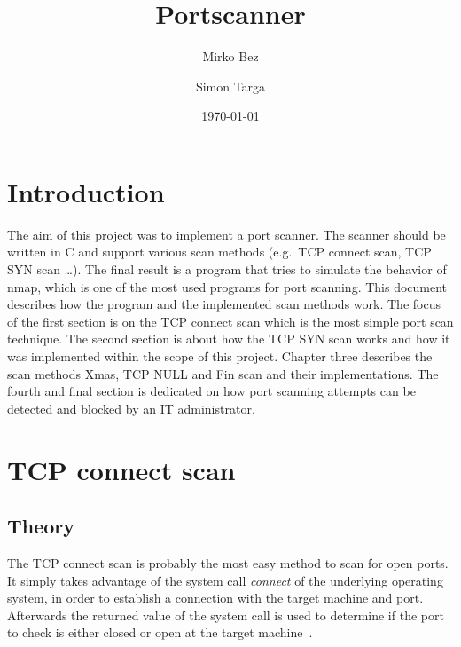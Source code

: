 \documentclass[a4paper]{scrartcl}
\begin{document}
	\title{Portscanner} \author{Mirko Bez \and  Simon Targa} \date{\today} \maketitle
	\tableofcontents
	\newpage

	\section*{Introduction}
	The aim of this project was to implement a port scanner. The scanner should be written in C and support various scan methods (e.g.\ TCP connect scan, TCP SYN scan \dots).
	The final result is a program that tries to simulate the behavior of nmap, which is one of the most used programs for port scanning. This document
	describes how the program and the implemented scan methods work. The focus of the first section is on the TCP connect scan which is the most simple port scan technique. The second
	section is about how the TCP SYN scan works and how it was implemented within the scope of this project. Chapter three describes the scan methods Xmas, TCP NULL and Fin scan and their
	implementations. The fourth and final section is dedicated on how port scanning attempts can be detected and blocked by an IT administrator.
	
	
	\section{TCP connect scan}
	\subsection{Theory}
	The TCP connect scan is probably the most easy method to scan for open ports. It simply takes advantage of the system call
	\emph{connect} of the underlying operating system, in order to establish a connection with the target machine and port. Afterwards the
	returned value of the system call is used to determine if the port to check is either closed or open at the target machine~\cite{nmap2009}. 
	
	
\end{document}
